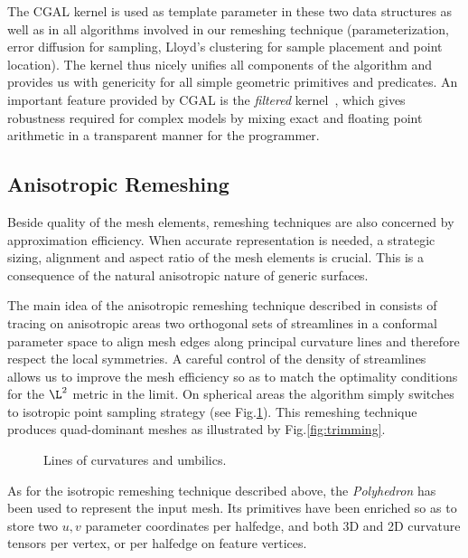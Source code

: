 The CGAL kernel is used as template parameter in these two data
structures as well as in all algorithms involved in our remeshing
technique (parameterization, error diffusion for sampling, Lloyd's
clustering for sample placement and point location). The kernel thus
nicely unifies all components of the algorithm and provides us with
genericity for all simple geometric primitives and predicates. An
important feature provided by CGAL is the \emph{filtered}
kernel~\cite{bbp-iayed-01,p-iaeia-99}, which gives robustness required
for complex models by mixing exact and floating point arithmetic in a
transparent manner for the programmer.

\subsection{Anisotropic Remeshing}


Beside quality of the mesh elements, remeshing techniques are also
concerned by approximation efficiency. When accurate representation is
needed, a strategic sizing, alignment and aspect ratio of the mesh
elements is crucial. This is a consequence of the natural anisotropic
nature of generic surfaces.


The main idea of the anisotropic remeshing technique described in
\cite{acdld-apr-03} consists of tracing on anisotropic areas two 
orthogonal sets of streamlines in a conformal parameter space to align
mesh edges along principal curvature lines and therefore respect the
local symmetries. A careful control of the density of streamlines
allows us to improve the mesh efficiency so as to match the optimality
conditions for the $\L^2$ metric in the limit. On spherical areas the
algorithm simply switches to isotropic point sampling strategy (see
Fig.\ref{fig:anisotropic}). This remeshing technique produces
quad-dominant meshes as illustrated by Fig.\ref{fig:trimming}.

\begin{figure}
  \centering
  \caption{Lines of curvatures and umbilics.}
  \label{fig:anisotropic}
\end{figure}

As for the isotropic remeshing technique described above, the
\emph{Polyhedron} has been used to represent the input mesh. Its
primitives have been enriched so as to store two $u,v$ parameter
coordinates per halfedge, and both 3D and 2D curvature tensors per
vertex, or per halfedge on feature vertices.

